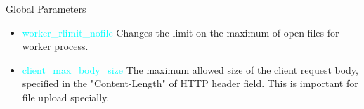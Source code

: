 \documentclass{beamer}
\begin{document}
\begin{frame}{Global Parameters}
\begin{itemize}
\item \textcolor{cyan}{worker\_rlimit\_nofile} Changes the limit on the maximum of open files for worker process. 
\item \textcolor{cyan}{client\_max\_body\_size} The maximum allowed size of the client request body, specified in the "Content-Length" of HTTP header field. This is important for file upload specially.
\end{itemize}
% 
\end{frame}


\end{document}
